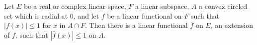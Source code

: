 Let $E$ be a real or complex linear space, $F$ a linear subspace, $A$ a convex circled set which is radial at $0$, and let $f$ be a linear functional on $F$ such that $|f(x)| \leq 1$ for $x$ in $A \cap F$. Then there is a linear functional $\overline{f}$ on $E$, an extension of $f$, such that $|\overline{f}(x)| \leq 1$ on $A$.
